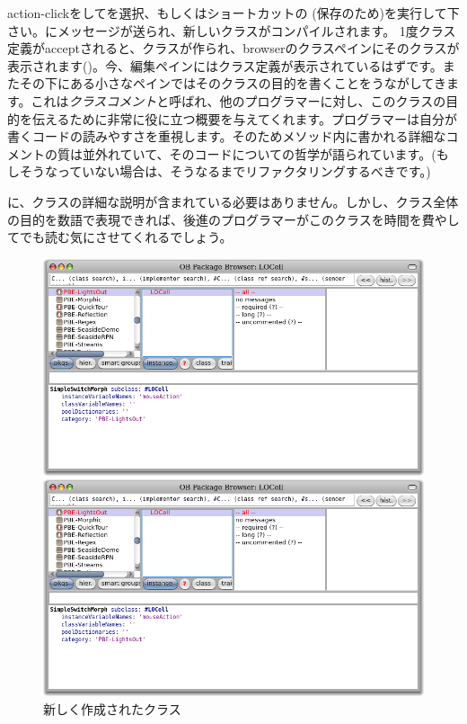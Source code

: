\documentclass[a4paper,10pt,twoside]{book}
\begin{document}
action-clickをしてを選択、もしくはショートカットの (保存のため)を実行して下さい。にメッセージが送られ、新しいクラスがコンパイルされます。
1度クラス定義がacceptされると、クラスが作られ、browserのクラスペインにそのクラスが表示されます()。今、編集ペインにはクラス定義が表示されているはずです。またその下にある小さなペインではそのクラスの目的を書くことをうながしてきます。これは\emph{クラスコメント}と呼ばれ、他のプログラマーに対し、このクラスの目的を伝えるために非常に役に立つ概要を与えてくれます。\st{}プログラマーは自分が書くコードの読みやすさを重視します。そのためメソッド内に書かれる詳細なコメントの質は並外れていて、そのコードについての哲学が語られています。(もしそうなっていない場合は、そうなるまでリファクタリングするべきです。)

に、クラスの詳細な説明が含まれている必要はありません。しかし、クラス全体の目的を数語で表現できれば、後進のプログラマーがこのクラスを時間を費やしてでも読む気にさせてくれるでしょう。


\begin{figure}[h!t]
\ifluluelse
	{\centerline {\includegraphics[width=\textwidth]{LOCell}}}
	{\centerline {\includegraphics[scale=0.7]{LOCell}}}
\caption{新しく作成されたクラス }
\end{figure}
\end{document}
